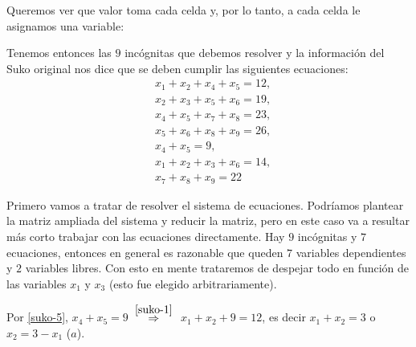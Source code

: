 \begin{enumerate}[topsep=6pt, itemsep=.4cm]
\rta Queremos ver que valor toma cada celda y, por lo tanto,  a cada celda le asignamos una variable:
\begin{center}
\end{center}
Tenemos entonces las $9$ incógnitas que debemos resolver y la información del Suko original nos dice que se deben cumplir las siguientes ecuaciones:
\begin{align}
&x_1 + x_2 +x_4 +x_5 =12, \label{suko-1} \\
&x_2+ x_3+x_5 +x_6 = 19, \label{suko-2}\\
&x_4 +x_5 +x_7 + x_8 = 23, \label{suko-3}\\
&x_5 +x_6 +x_8 + x_9 = 26, \label{suko-4}\\
&x_4 + x_5 = 9, \label{suko-5}\\
&x_1+x_2 +x_3 +x_6 = 14, \label{suko-6}\\
&x_7+ x_8 + x_9 = 22\label{suko-7}
\end{align}


Primero vamos a tratar de resolver el sistema de ecuaciones. Podríamos plantear  la matriz ampliada del sistema y  reducir la matriz, pero en este caso va a resultar más corto trabajar con las ecuaciones directamente. Hay $9$ incógnitas y $7$ ecuaciones, entonces en general es razonable que queden $7$ variables dependientes y $2$ variables libres. Con esto en mente trataremos de despejar todo en función de las variables $x_1$ y $x_3$ (esto fue elegido arbitrariamente). 


Por \eqref{suko-5}, $x_4 + x_5 = 9$ $\;\stackrel{\eqref{suko-1}}{\Rightarrow}\;$ $x_1 + x_2 + 9 =12$,  es decir $x_1 + x_2  =3$ o \colorbox{green!20}{$x_2 = 3 -x_1$ ($a$)}.



\end{enumerate}

